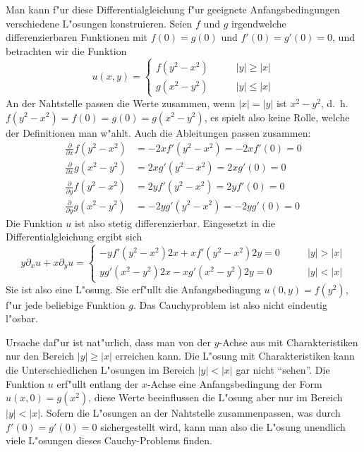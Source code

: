 \begin{loesung}
Man kann f"ur diese Differentialgleichung f"ur geeignete Anfangsbedingungen
verschiedene L"osungen konstruieren. Seien $f$ und $g$ irgendwelche
differenzierbaren Funktionen mit $f(0)=g(0)$ und $f'(0)=g'(0)=0$,
und betrachten wir die Funktion
\[
u(x,y)=\begin{cases}
f(y^2-x^2)&\qquad |y|\ge|x|\\
g(x^2-y^2)&\qquad |y|\le|x|
\end{cases}
\]
An der Nahtstelle passen die Werte zusammen, wenn $|x|=|y|$ ist $x^2-y^2$,
d.~h.~$f(y^2-x^2)=f(0)=g(0)=g(x^2-y^2)$, es spielt also keine Rolle, welche
der Definitionen man w"ahlt.
Auch die Ableitungen passen zusammen:
\begin{align*}
\frac{\partial}{\partial x}f(y^2-x^2)&=-2xf'(y^2-x^2)=-2xf'(0)=0
\\
\frac{\partial}{\partial x}g(x^2-y^2)&=2xg'(y^2-x^2)=2xg'(0)=0
\\
\frac{\partial}{\partial y}f(y^2-x^2)&=2yf'(y^2-x^2)=2yf'(0)=0
\\
\frac{\partial}{\partial y}g(x^2-y^2)&=-2yg'(y^2-x^2)=-2yg'(0)=0
\end{align*}
Die Funktion $u$ ist also stetig differenzierbar.
Eingesetzt in die Differentialgleichung ergibt sich
\[
y\partial_xu+x\partial_yu
=
\begin{cases}
-yf'(y^2-x^2)2x+xf'(y^2-x^2)2y=0&\qquad |y|>|x|\\
yg'(x^2-y^2)2x-xg'(x^2-y^2)2y=0&\qquad |y|<|x|
\end{cases}
\]
Sie ist also eine L"osung. Sie erf"ullt die Anfangsbedingung
$u(0,y)=f(y^2)$, f"ur jede beliebige Funktion $g$. Das Cauchyproblem
ist also nicht eindeutig l"osbar.

Ursache daf"ur ist nat"urlich, dass man von der $y$-Achse aus mit
Charakteristiken nur den Bereich $|y|\ge |x|$ erreichen kann.
Die L"osung mit Charakteristiken kann die Unterschiedlichen L"osungen
im Bereich $|y|<|x|$ gar nicht ``sehen''.
Die Funktion $u$ erf"ullt entlang der $x$-Achse eine Anfangsbedingung
der Form $u(x,0)=g(x^2)$, diese Werte beeinflussen die L"osung aber
nur im Bereich $|y|<|x|$. Sofern die L"osungen an der Nahtstelle
zusammenpassen, was durch $f'(0)=g'(0)=0$ sichergestellt wird,
kann man also die L"osung unendlich viele L"osungen dieses Cauchy-Problems
finden.
\end{loesung}


